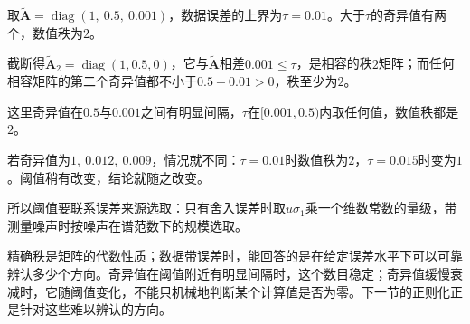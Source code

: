 \begin{example}[数值秩与阈值]
\label{ex:ls-numerical-rank}
取$\tilde{\bm A}=\operatorname{diag}(1,\ 0.5,\ 0.001)$，数据误差的上界为$\tau=0.01$。大于$\tau$的奇异值有两个，数值秩为$2$。

截断得$\tilde{\bm A}_2=\operatorname{diag}(1,0.5,0)$，它与$\tilde{\bm A}$相差$0.001\leq\tau$，是相容的秩$2$矩阵；而任何相容矩阵的第二个奇异值都不小于$0.5-0.01>0$，秩至少为$2$。

这里奇异值在$0.5$与$0.001$之间有明显间隔，$\tau$在$[0.001,0.5)$内取任何值，数值秩都是$2$。

若奇异值为$1,\ 0.012,\ 0.009$，情况就不同：$\tau=0.01$时数值秩为$2$，$\tau=0.015$时变为$1$。阈值稍有改变，结论就随之改变。
\end{example}

所以阈值要联系误差来源选取：只有舍入误差时取$u\sigma_1$乘一个维数常数的量级，带测量噪声时按噪声在谱范数下的规模选取。

精确秩是矩阵的代数性质；数据带误差时，能回答的是在给定误差水平下可以可靠辨认多少个方向。奇异值在阈值附近有明显间隔时，这个数目稳定；奇异值缓慢衰减时，它随阈值变化，不能只机械地判断某个计算值是否为零。下一节的正则化正是针对这些难以辨认的方向。
